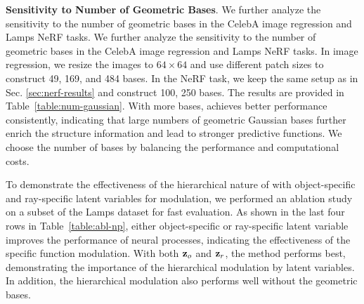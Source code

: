 \begin{table}[htbp]
\vspace{-4mm}
\caption{\textbf{Sensitivity to the number of geometric bases} on NeRF and image regression.}
\label{tab: ablate_basis}
\vspace{-6mm}
\end{table}
\textbf{Sensitivity to Number of Geometric Bases}.
We further analyze the sensitivity to the number of geometric bases in the CelebA image regression and Lamps NeRF tasks. 
We further analyze the sensitivity to the number of geometric bases in the CelebA image regression and Lamps NeRF tasks. 
In image regression, we resize the images to \(64 \times 64\) and use different patch sizes to construct 49, 169, and 484 bases. In the NeRF task, we keep the same setup as in Sec. \ref{sec:nerf-results} and construct 100, 250 bases. The results are provided in Table~\ref{table:num-gaussian}. With more bases, \method{} achieves better performance consistently, indicating that large numbers of geometric Gaussian bases further enrich the structure information and lead to stronger predictive functions. 
We choose the number of bases by balancing the performance and computational costs.





To demonstrate the effectiveness of the hierarchical nature of \method{} with object-specific and ray-specific latent variables for modulation, we performed an ablation study on a subset of the Lamps dataset for fast evaluation. As shown in the last four rows in Table~\ref{table:abl-np}, either object-specific or ray-specific latent variable improves the performance of neural processes, indicating the effectiveness of the specific function modulation. With both ${\bf{z}}_o$ and ${\bf{z}}_r$, the method performs best, demonstrating the importance of the hierarchical modulation by latent variables. 
In addition, the hierarchical modulation also performs well without the geometric bases.

